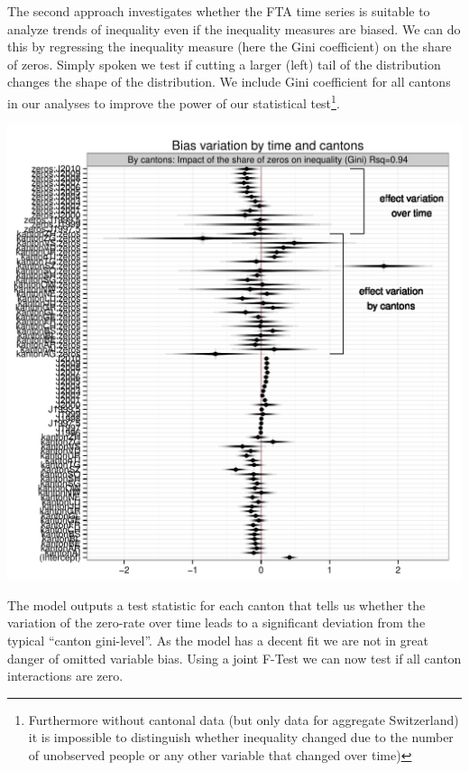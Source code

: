 \documentclass[twoside]{article}\usepackage[]{graphicx}\usepackage[]{color}
\makeatletter
\def\maxwidth{ %
  \ifdim\Gin@nat@width>\linewidth
    \linewidth
  \else
    \Gin@nat@width
  \fi
}
\newenvironment{knitrout}{}{} %
\makeatother
\begin{document}
\begin{multicols}{2}
The second approach investigates whether the FTA time series is suitable to analyze trends of inequality even if the inequality measures are biased. We can do this by regressing the inequality measure (here the Gini coefficient) on the share of zeros. Simply spoken we test if cutting a larger (left) tail of the distribution changes the shape of the distribution. We include Gini coefficient for all cantons in our analyses to improve the power of our statistical test\footnote{Furthermore without cantonal data (but only data for aggregate Switzerland) it is impossible to distinguish whether inequality changed due to the number of unobserved people or any other variable that changed over time)}. 

\begin{knitrout}
\color{fgcolor}
\includegraphics[width=\maxwidth]{figure/corrected_gini} 

\end{knitrout}

The model outputs a test statistic for each canton that tells us whether the variation of the zero-rate over time leads to a significant deviation from the typical ``canton gini-level''. As the model has a decent fit we are not in great danger of omitted variable bias. Using a joint F-Test we can now test if all canton interactions are zero. 




\end{multicols}
\end{document}
